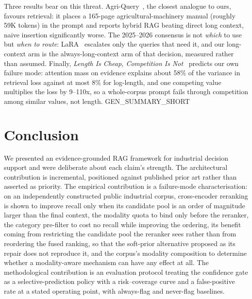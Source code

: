 \documentclass[conference]{IEEEtran}
\begin{document}
Three results bear on this threat. Agri-Query~\cite{chen2026agriquery}, the
closest analogue to ours, favours retrieval: it places a 165-page
agricultural-machinery manual (roughly 59K tokens) in the prompt and reports
hybrid RAG beating direct long context, naive insertion significantly worse.
The 2025--2026 consensus is not \emph{which} to use but \emph{when to route}:
LaRA~\cite{lu2025lara} escalates only the queries that need it, and our
long-context arm is the always-long-context arm of that decision, measured
rather than assumed. Finally, \emph{Length Is Cheap, Competition Is Not}~\cite{liu2026lengthcheap}
predicts our own failure mode: attention mass on evidence explains about 58\%
of the variance in retrieval loss against at most 8\% for log-length, and one
competing value multiplies the loss by 9--110x, so a whole-corpus prompt fails
through competition among similar values, not length.
{{GEN_SUMMARY_SHORT}}

\section{Conclusion}

We presented an evidence-grounded RAG framework for industrial decision
support and were deliberate about each claim's strength. The architectural
contribution is incremental, positioned against published prior art rather than
asserted as priority. The empirical contribution is a failure-mode
characterisation: on an independently constructed public industrial corpus,
cross-encoder reranking is shown to improve recall only when its candidate
pool is an order of magnitude larger than the final context, the modality quota
to bind only before the reranker, the category pre-filter to cost no recall while improving the ordering, its benefit coming
from restricting the candidate pool the reranker sees rather than from reordering the fused
ranking, so that the soft-prior alternative proposed as its repair does not reproduce it, and the corpus's modality composition to
determine whether a modality-aware mechanism can have any effect at all. The
methodological contribution is an evaluation protocol treating the confidence
gate as a selective-prediction policy with a risk--coverage curve and a
false-positive rate at a stated operating point, with always-flag and never-flag
baselines.
\end{document}
